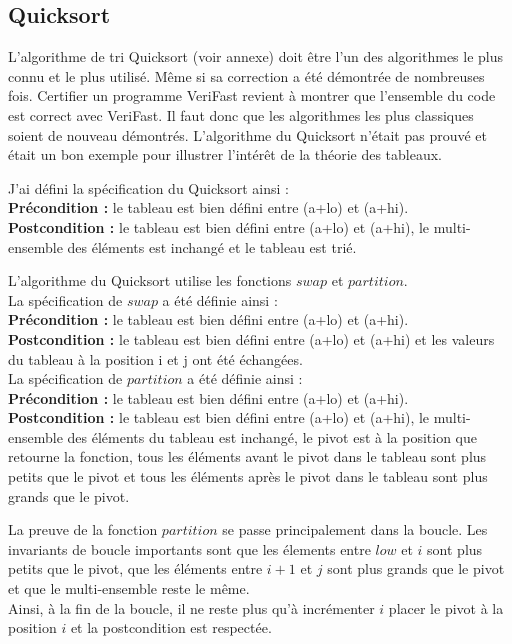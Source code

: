 \documentclass[11pt,openany]{article}
\newcommand{\verifast}{VeriFast}
\begin{document}
	\subsection{Quicksort}
		L'algorithme de tri Quicksort (voir annexe) doit \^etre l'un des algorithmes le plus connu et le plus utilis\'e. M\^eme si sa correction a \'et\'e d\'emontr\'ee de nombreuses fois. Certifier un programme \verifast{} revient \`a montrer que l'ensemble du code est correct avec \verifast. Il faut donc que les algorithmes les plus classiques soient de nouveau d\'emontr\'es. L'algorithme du Quicksort n'\'etait pas prouv\'e et \'etait un bon exemple pour illustrer l'int\'er\^et de la th\'eorie des tableaux. 
		
		J'ai d\'efini la sp\'ecification du Quicksort ainsi :\\
		\textbf{Pr\'econdition :} le tableau est bien d\'efini entre (a+lo) et (a+hi).\\
		\textbf{Postcondition :} le tableau est bien d\'efini entre (a+lo) et (a+hi), le multi-ensemble des \'el\'ements est inchang\'e et le tableau est tri\'e.
		
		L'algorithme du Quicksort utilise les fonctions $swap$ et $partition$.\\ La sp\'ecification de $swap$ a \'et\'e d\'efinie ainsi :\\
		\textbf{Pr\'econdition :} le tableau est bien d\'efini entre (a+lo) et (a+hi).\\
		\textbf{Postcondition :} le tableau est bien d\'efini entre (a+lo) et (a+hi) et les valeurs du tableau \`a la position i et j ont \'et\'e \'echang\'ees. \\
La sp\'ecification de $partition$ a \'et\'e d\'efinie ainsi :\\
		\textbf{Pr\'econdition :} le tableau est bien d\'efini entre (a+lo) et (a+hi).\\
		\textbf{Postcondition :} le tableau est bien d\'efini entre (a+lo) et (a+hi), le multi-ensemble des \'el\'ements du tableau est inchang\'e, le pivot est \`a la position que retourne la fonction, tous les \'el\'ements avant le pivot dans le tableau sont plus petits que le pivot et tous les \'el\'ements apr\`es le pivot dans le tableau sont plus grands que le pivot.
		
		La preuve de la fonction $partition$ se passe principalement dans la boucle. Les invariants de boucle importants sont que les \'elements entre $low$ et $i$ sont plus petits que le pivot, que les \'el\'ements entre $i+1$ et $j$ sont plus grands que le pivot et que le multi-ensemble reste le m\^eme.\\
		Ainsi, \`a la fin de la boucle, il ne reste plus qu'\`a incr\'ementer $i$ placer le pivot \`a la position $i$ et la postcondition est respect\'ee.
		
\end{document}
